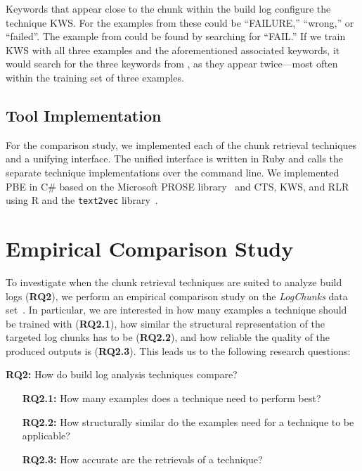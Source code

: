 Keywords that appear close to the chunk within
the build log configure the technique KWS\@.
For the examples from  these could be
``FAILURE,'' ``wrong,'' or ``failed''.
The example from  could be found
by searching for ``FAIL.''
If we train KWS with all three examples and the aforementioned
associated keywords, it would search for the three keywords from
, as they appear twice---most often within
the training set of three examples.

\subsection{Tool Implementation}
For the comparison study, we implemented each of the chunk retrieval
techniques and a unifying interface.
The unified interface is written in Ruby and
calls the separate technique implementations over the command line.
We implemented PBE in C\# based on the Microsoft PROSE
library~\cite{prose2019webpage} and CTS, KWS, and RLR using
R and the {\tt text2vec} library~\cite{text2vec2019webpage}.


\section{Empirical Comparison Study}


\label{sec:study}

To investigate when the chunk retrieval techniques are suited to
analyze build logs (\textbf{RQ2}), we perform an empirical comparison
study on the \emph{LogChunks} data set~\cite{brandt2020logchunks}.
In particular, we are interested in how many examples a technique
should be trained with (\textbf{RQ2.1}),
how similar the structural representation of the targeted log chunks
has to be (\textbf{RQ2.2}), and how reliable the quality of the
produced outputs is (\textbf{RQ2.3}).
This leads us to the following research questions:

\begin{simplebox}[minipage boxed title*=-1.5cm,
attach boxed title to top center={yshift=-6mm}]
{\textbf{RQ2:} How do build log analysis techniques compare?}
\begin{itemize}[leftmargin=1.2cm]
  \item[\textbf{RQ2.1:}] How many examples does a technique need to
  perform best?
  \item[\textbf{RQ2.2:}] How structurally similar do the examples
  need for a technique to be applicable?
  \item[\textbf{RQ2.3:}] How accurate are the retrievals of a technique?
\end{itemize}
\end{simplebox}

